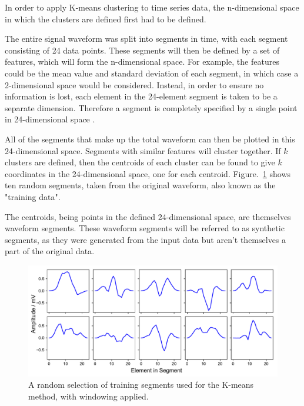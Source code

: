 In order to apply K-means clustering to time series data, the n-dimensional space in which the clusters are defined first had to be defined. 

The entire signal waveform was split into segments in time, with each segment consisting of 24 data points. These segments will then be defined by a set of features, which will form the n-dimensional space. For example, the features could be the mean value and standard deviation of each segment, in which case a 2-dimensional space would be considered. Instead, in order to ensure no information is lost, each element in the 24-element segment is taken to be a separate dimension. Therefore a segment is completely specified by a single point in 24-dimensional space \cite{lin_vlachos_keogh_gunopulos_2004}.

All of the segments that make up the total waveform can then be plotted in this 24-dimensional space. Segments with similar features will cluster together. If $k$ clusters are defined, then the centroids of each cluster can be found to give $k$ coordinates in the 24-dimensional space, one for each centroid. Figure.~\ref{fig:kmeans_training} shows ten random segments, taken from the original waveform, also known as the "training data".

The centroids, being points in the defined 24-dimensional space, are themselves waveform segments. These waveform segments will be referred to as synthetic segments, as they were generated from the input data but aren't themselves a part of the original data. 

\begin{figure}[t]
    \includegraphics[width=1.0\textwidth]{fig/kmeans_training.pdf}
    \caption[K-means training segments]{A random selection of training segments used for the K-means method, with windowing applied.}
    \label{fig:kmeans_training}
\end{figure}

